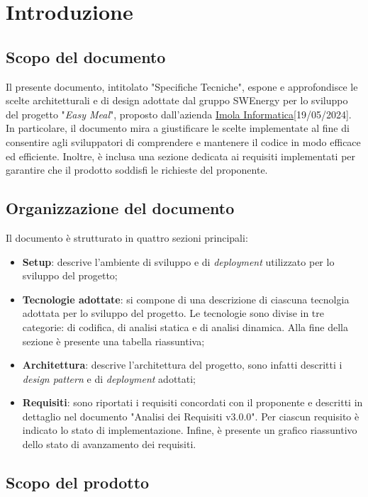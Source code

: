 \section{Introduzione}

\subsection{Scopo del documento}

Il presente documento, intitolato "Specifiche Tecniche", espone e approfondisce
le scelte architetturali e di design adottate dal gruppo SWEnergy per lo
sviluppo del progetto "\textit{Easy Meal}", proposto dall'azienda \href{https://imolainformatica.it}{Imola Informatica}[19/05/2024].
In particolare, il documento mira a giustificare le
scelte implementate al fine di consentire agli sviluppatori di comprendere e
mantenere il codice in modo efficace ed efficiente. Inoltre, è inclusa una
sezione dedicata ai requisiti implementati per garantire che il prodotto
soddisfi le richieste del proponente.

\subsection{Organizzazione del documento}
Il documento è strutturato in quattro sezioni principali:
\begin{itemize}
	\item \textbf{Setup}: descrive l'ambiente di sviluppo e di 
		\textit{deployment} utilizzato per lo sviluppo del progetto;
	\item \textbf{Tecnologie adottate}: si compone di una descrizione di
	      ciascuna tecnolgia adottata per lo sviluppo del progetto.
	      Le tecnologie sono divise in tre categorie: di codifica,
	      di analisi statica e di analisi dinamica. Alla fine della sezione è
	      presente una tabella riassuntiva;
	\item \textbf{Architettura}: descrive l'architettura del progetto, sono
		infatti descritti i \textit{design pattern} e di \textit{deployment} adottati;
	\item \textbf{Requisiti}: sono riportati i requisiti concordati con il
	      proponente e descritti in dettaglio nel documento "Analisi dei
	      Requisiti v3.0.0". Per ciascun requisito è indicato lo
	      stato di implementazione. Infine, è presente un grafico riassuntivo
	      dello stato di avanzamento dei requisiti.
\end{itemize}


\subsection{Scopo del prodotto}

